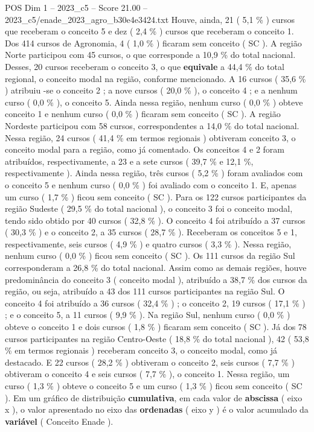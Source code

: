\begin{textsample}{POS Dim 1 – 2023\_c5 – Score 21.00 – 2023\_c5/enade\_2023\_agro\_b30e4e3424.txt}
Houve, ainda, 21 ( 5,1 \% ) cursos que receberam o conceito 5 e dez ( 2,4 \% ) cursos que receberam o conceito 1.
Dos 414 cursos de Agronomia, 4 ( 1,0 \% ) ficaram sem conceito ( SC ).
A região Norte participou com 45 cursos, o que corresponde a 10,9 \% do total nacional.
Desses, 20 cursos receberam o conceito 3, o que \textbf{equivale} a 44,4 \% do total regional, o conceito modal na região, conforme mencionado.
A 16 cursos ( 35,6 \% ) atribuiu -se o conceito 2 ; a nove cursos ( 20,0 \% ), o conceito 4 ; e a nenhum curso ( 0,0 \% ), o conceito 5.
Ainda nessa região, nenhum curso ( 0,0 \% ) obteve conceito 1 e nenhum curso ( 0,0 \% ) ficaram sem conceito ( SC ).
A região Nordeste participou com 58 cursos, correspondentes a 14,0 \% do total nacional.
Nessa região, 24 cursos ( 41,4 \% em termos regionais ) obtiveram conceito 3, o conceito modal para a região, como já comentado.
Os conceitos 4 e 2 foram atribuídos, respectivamente, a 23 e a sete cursos ( 39,7 \% e 12,1 \%, respectivamente ).
Ainda nessa região, três cursos ( 5,2 \% ) foram avaliados com o conceito 5 e nenhum curso ( 0,0 \% ) foi avaliado com o conceito 1.
E, apenas um curso ( 1,7 \% ) ficou sem conceito ( SC ).
Para os 122 cursos participantes da região Sudeste ( 29,5 \% do total nacional ), o conceito 3 foi o conceito modal, tendo sido obtido por 40 cursos ( 32,8 \% ).
O conceito 4 foi atribuído a 37 cursos ( 30,3 \% ) e o conceito 2, a 35 cursos ( 28,7 \% ).
Receberam os conceitos 5 e 1, respectivamente, seis cursos ( 4,9 \% ) e quatro cursos ( 3,3 \% ).
Nessa região, nenhum curso ( 0,0 \% ) ficou sem conceito ( SC ).
Os 111 cursos da região Sul corresponderam a 26,8 \% do total nacional.
Assim como as demais regiões, houve predominância do conceito 3 ( conceito modal ), atribuído a 38,7 \% dos cursos da região, ou seja, atribuído a 43 dos 111 cursos participantes na região Sul.
O conceito 4 foi atribuído a 36 cursos ( 32,4 \% ) ; o conceito 2, 19 cursos ( 17,1 \% ) ; e o conceito 5, a 11 cursos ( 9,9 \% ).
Na região Sul, nenhum curso ( 0,0 \% ) obteve o conceito 1 e dois cursos ( 1,8 \% ) ficaram sem conceito ( SC ).
Já dos 78 cursos participantes na região Centro-Oeste ( 18,8 \% do total nacional ), 42 ( 53,8 \% em termos regionais ) receberam conceito 3, o conceito modal, como já destacado.
E 22 cursos ( 28,2 \% ) obtiveram o conceito 2, seis cursos ( 7,7 \% ) obtiveram o conceito 4 e seis cursos ( 7,7 \% ), o conceito 1.
Nessa região, um curso ( 1,3 \% ) obteve o conceito 5 e um curso ( 1,3 \% ) ficou sem conceito ( SC ).
Em um gráfico de distribuição \textbf{cumulativa}, em cada valor de \textbf{abscissa} ( eixo x ), o valor apresentado no eixo das \textbf{ordenadas} ( eixo y ) é o valor acumulado da \textbf{variável} ( Conceito Enade ).

\end{textsample}
